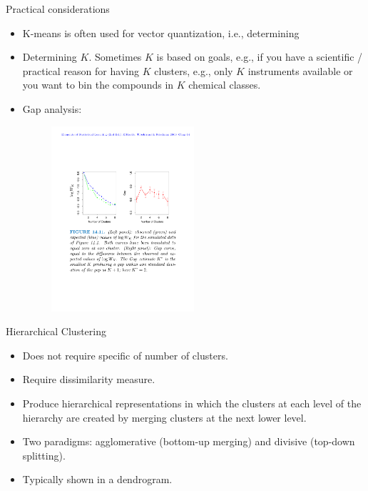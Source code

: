 \documentclass[aspectratio=169]{beamer}
\begin{document}
\begin{frame}{Practical considerations}
    \begin{itemize}
        \item K-means is often used for vector quantization, i.e., determining
        \item Determining $K$. Sometimes $K$ is based on goals, e.g., if you have a scientific / practical reason for having $K$ clusters, e.g., only $K$ instruments available or you want to bin the compounds in $K$ chemical classes.
        \item Gap analysis:
        \begin{figure}
            \centering
            \includegraphics[width=0.5\textwidth]{figures/kmeans-gap-analysis.pdf}
        \end{figure}
    \end{itemize}
\end{frame}


\begin{frame}{Hierarchical Clustering}
    \begin{itemize}
        \item Does not require specific of number of clusters.
        \item Require dissimilarity measure.
        \item Produce hierarchical representations in which the clusters at each level of the hierarchy are created by merging clusters at the next lower level. 
        \item Two paradigms: agglomerative (bottom-up merging) and divisive (top-down splitting).
        \item Typically shown in a dendrogram.
    \end{itemize}
\end{frame}
\end{document}
